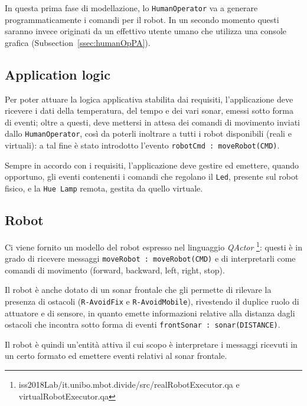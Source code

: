 \documentclass{../llncs}
\newcommand{\codescript}[1]{{\mbox{\small{\texttt{#1}}}}\xspace}
\newcommand{\code}[1]{{\color{blue}\small{\texttt{#1}}}}
\newcommand{\qa}{\textsf{\textit{QActor}}\xspace}
\newcommand{\labelssec}[1]{\label{ssec:#1}}
\newcommand{\xss}[1]{\subsectionname~\ref{ssec:#1}}
\newcommand{\subsectionname}{Subsection}
\begin{document}


In questa prima fase di modellazione, lo \texttt{HumanOperator} va a generare programmaticamente i comandi per il robot. In un secondo momento questi saranno invece originati da un effettivo utente umano che utilizza una console grafica (\xss{humanOpPA}).

\subsection{Application logic}
Per poter attuare la logica applicativa stabilita dai requisiti, l'applicazione deve ricevere i dati della temperatura, del tempo e dei vari sonar, emessi sotto forma di eventi; oltre a questi, deve mettersi in attesa dei comandi di movimento inviati dallo \texttt{HumanOperator}, così da poterli inoltrare a tutti i robot disponibili (reali e virtuali): a tal fine è stato introdotto l'evento \codescript{robotCmd : moveRobot(CMD)}.

Sempre in accordo con i requisiti, l'applicazione deve gestire ed emettere, quando opportuno, gli eventi contenenti i comandi che regolano il \texttt{Led}, presente sul robot fisico, e la \texttt{Hue Lamp} remota, gestita da quello virtuale.\\



\subsection{Robot}
\labelssec{robotRA}
Ci viene fornito un modello del robot espresso nel linguaggio \qa
\footnote{iss2018Lab/it.unibo.mbot.divide/src/realRobotExecutor.qa e virtualRobotExecutor.qa}: questi è in grado di ricevere messaggi \codescript{moveRobot : moveRobot(CMD)} e di interpretarli come comandi di movimento (forward, backward, left, right, stop).

Il robot è anche dotato di un sonar frontale che gli permette di rilevare la presenza di ostacoli (\code{R-AvoidFix} e \code{R-AvoidMobile}), rivestendo il duplice ruolo di attuatore e di sensore, in quanto emette informazioni relative alla distanza dagli ostacoli che incontra sotto forma di eventi \codescript{frontSonar : sonar(DISTANCE)}.

Il robot è quindi un'entità attiva il cui scopo è interpretare i messaggi ricevuti in un certo formato ed emettere eventi relativi al sonar frontale.\\
\end{document}
